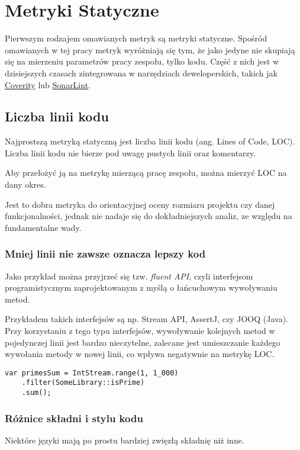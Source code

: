 \section{Metryki Statyczne}
Pierwszym rodzajem omawianych metryk są metryki statyczne. Spośród omawianych w tej pracy metryk wyróżniają się tym,
że jako jedyne nie skupiają się na mierzeniu parametrów pracy zespołu, tylko kodu.
Część z nich jest w dzisiejszych czasach zintegrowana w narzędziach deweloperskich, takich jak \href{https://www.synopsys.com/software-integrity/static-analysis-tools-sast/coverity.html}{Coverity}
lub \href{https://www.sonarsource.com/products/sonarlint/}{SonarLint}.

\subsection{Liczba linii kodu}
\label{loc}
Najprostszą metryką statyczną jest liczba linii kodu (ang. Lines of Code, LOC). Liczba linii kodu nie bierze pod uwagę pustych linii oraz komentarzy.

Aby przełożyć ją na metrykę mierzącą pracę zespołu, można mierzyć LOC na dany okres.

Jest to dobra metryka do orientacyjnej oceny rozmiaru projektu czy danej funkcjonalności, jednak nie nadaje
się do dokładniejszych analiz, ze względu na fundamentalne wady.

\subsubsection*{Mniej linii nie zawsze oznacza lepszy kod}
Jako przykład można przyjrzeć się tzw. \textit{fluent API}, czyli interfejsom programistycznym zaprojektowanym z myślą o łańcuchowym wywoływaniu metod.

Przykładem takich interfejsów są np. Stream API, AssertJ, czy JOOQ (Java).
Przy korzystaniu z tego typu interfejsów, wywoływanie kolejnych metod w pojedynczej linii jest bardzo nieczytelne, zalecane jest
umieszczanie każdego wywołania metody w nowej linii, co wpływa negatywnie na metrykę LOC.
\begin{lstlisting}[caption=Sumowanie liczb pierwszych przy użyciu Stream API (Java)]
var primesSum = IntStream.range(1, 1_000)
    .filter(SomeLibrary::isPrime)
    .sum();
\end{lstlisting}

\subsubsection*{Różnice składni i stylu kodu}
Niektóre języki mają po prostu bardziej zwięzłą składnię niż inne.

